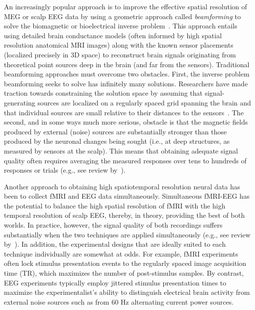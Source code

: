 \documentclass[11pt]{article}
\begin{document}
An increasingly popular approach is to improve the effective spatial
resolution of MEG or scalp EEG data by using a geometric approach
called \textit{beamforming} to solve the biomagnetic or bioelectrical
inverse problem~\cite{Sarv87}.  This approach entails using detailed
brain conductance models (often informed by high spatial resolution
anatomical MRI images) along with the known sensor placements
(localized precisely in 3D space) to reconstruct brain signals
originating from theoretical point sources deep in the brain (and far
from the sensors).  Traditional beamforming approaches must overcome
two obstacles.  First, the inverse problem beamforming seeks to solve
has infinitely many solutions.  Researchers have made traction towards
constraining the solution space by assuming that signal-generating
sources are localized on a regularly spaced grid spanning the brain
and that individual sources are small relative to their distances to
the sensors~\cite{Snyd91, BailEtal01, HillEtal05}.  The second, and in
some ways much more serious, obstacle is that the magnetic fields
produced by external (noise) sources are substantially stronger than
those produced by the neuronal changes being sought (i.e., at deep
structures, as measured by sensors at the scalp).  This means that
obtaining adequate signal quality often requires averaging the
measured responses over tens to hundreds of responses or trials
(e.g., see review by~\cite{HillEtal05}).

Another approach to obtaining high spatiotemporal resolution
neural data has been to collect fMRI and EEG data simultaneously.
Simultaneous fMRI-EEG has the potential to balance the high spatial
resolution of fMRI with the high temporal resolution of scalp EEG,
thereby, in theory, providing the best of both worlds.  In practice,
however, the signal quality of both recordings suffers substantially
when the two techniques are applied simultaneously (e.g., see review
by~\cite{HustEtal12}).  In addition, the experimental designs that are
ideally suited to each technique individually are somewhat at odds.
For example, fMRI experiments often lock stimulus presentation
events to the regularly spaced image acquisition time (TR), which
maximizes the number of post-stimulus samples.  By contrast, EEG
experiments typically employ jittered stimulus presentation times to
maximize the experimentalist's ability to distinguish electrical brain
activity from external noise sources such as from 60 Hz alternating
current power sources.
\end{document}
